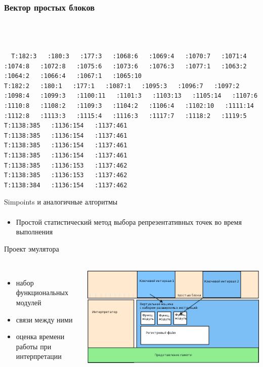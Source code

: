 \documentclass{beamer}              %
\begin{document}
\begin{frame}[fragile]
  \frametitle{Вектор простых блоков}
  
  \begin{lstlisting}[frame=single]
 

  
  T:182:3   :180:3   :177:3   :1068:6   :1069:4   :1070:7   :1071:4   :1074:8   :1072:8   :1075:6   :1073:6   :1076:3   :1077:1   :1063:2   :1064:2   :1066:4   :1067:1   :1065:10      
T:182:2   :180:1   :177:1   :1087:1   :1095:3   :1096:7   :1097:2   :1098:4   :1099:3   :1100:11   :1101:3   :1103:13   :1105:14   :1107:6   :1110:8   :1108:2   :1109:3   :1104:2   :1106:4   :1102:10   :1111:14   :1112:8   :1113:3   :1115:4   :1116:3   :1117:7   :1118:2   :1119:5   
T:1138:385   :1136:154   :1137:461   
T:1138:385   :1136:154   :1137:461   
T:1138:385   :1136:154   :1137:461   
T:1138:385   :1136:154   :1137:461   
T:1138:385   :1136:153   :1137:462   
T:1138:385   :1136:153   :1137:462   
T:1138:384   :1136:154   :1137:462   
\end{lstlisting}
  
  
\end{frame}


\begin{frame}{Simpoints и аналогичные алгоритмы}
  \framesubtitle{}
  
  \begin{itemize}
      \item Простой статистический метод выбора репрезентативных точек во время выполнения
      
  \end{itemize}
  
\end{frame}


\begin{frame}{Проект эмулятора}
  \framesubtitle{}
   
  \begin{columns}
      \begin{itemize}
        \item набор функциональных модулей
        \item связи между ними
        \item оценка времени работы при интерпретации
      \end{itemize}

      \includegraphics[width=.8\textwidth]{img/Emulator.png}
  \end{columns}		  
\end{frame}
\end{document}

